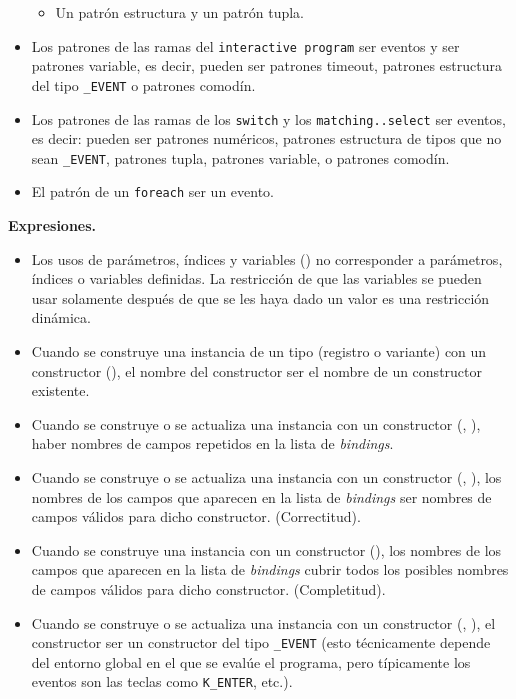 \documentclass{article}
\begin{document}
\begin{itemize}
\begin{itemize}
      \item Un patr\'on estructura y un patr\'on tupla.
      \end{itemize}
\item Los patrones de las ramas del \texttt{interactive program}
      \DEBEN ser eventos y \NOPUEDEN ser patrones variable, es decir,
      pueden ser
      patrones timeout,
      patrones estructura del tipo \texttt{\_EVENT}
      o patrones comod\'in.
\item Los patrones de las ramas de los \texttt{switch} y los \texttt{matching..select} \NOPUEDEN ser eventos, es decir:
      pueden ser
      patrones num\'ericos,
      patrones estructura de tipos que no sean \texttt{\_EVENT},
      patrones tupla,
      patrones variable,
      o patrones comod\'in.
\item El patr\'on de un \texttt{foreach} \NOPUEDE ser un evento.
\end{itemize}

{\bf Expresiones.}
\begin{itemize}
\item Los usos de par\'ametros, \'indices y variables () \PUEDEN no corresponder a par\'ametros, \'indices o variables definidas.
      La restricci\'on de que las variables se pueden usar solamente despu\'es de que se les haya dado un valor es una restricci\'on din\'amica.
\item Cuando se construye una instancia de un tipo (registro o variante) con un constructor (),
      el nombre del constructor \DEBE ser el nombre de un constructor existente.
\item Cuando se construye o se actualiza una instancia con un constructor (, ),
      \NOPUEDE haber nombres de campos repetidos en la lista de {\em bindings}.
\item Cuando se construye o se actualiza una instancia con un constructor (, ),
      los nombres de los campos que aparecen en la lista de {\em bindings}
      \DEBEN ser nombres de campos v\'alidos para dicho constructor. (Correctitud).
\item Cuando se construye una instancia con un constructor (),
      los nombres de los campos que aparecen en la lista de {\em bindings}
      \DEBEN cubrir todos los posibles nombres de campos v\'alidos para dicho constructor. (Completitud).
\item Cuando se construye o se actualiza una instancia con un constructor (, ),
      el constructor \NOPUEDE ser un constructor del tipo \texttt{\_EVENT} (esto t\'ecnicamente depende
      del entorno global en el que se eval\'ue el programa, pero t\'ipicamente
      los eventos son las teclas como \texttt{K\_ENTER}, etc.).
\end{itemize}
\end{document}
